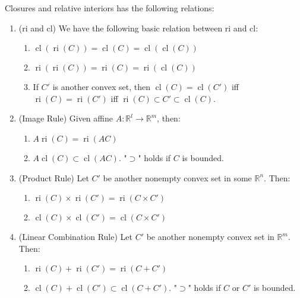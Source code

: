 \begin{prop}\label{prop:012-yoga-ri-cl}Closures and relative interiors has the following relations:
	\begin{enumerate}[label=(\alph*)]
		\item (ri and cl) We have the following basic relation between ri and cl:
		      \begin{enumerate}[label=(\roman*)]
			      \item $\operatorname{cl}(\operatorname{ri}(C))=\operatorname{cl}(C)=\operatorname{cl}(\operatorname{cl}(C))$
			      \item $\operatorname{ri}(\operatorname{ri}(C))=\operatorname{ri}(C)=\operatorname{ri}(\operatorname{cl}(C))$
			      \item If $C'$ is another convex set, then $\operatorname{cl}(C)=\operatorname{cl}(C')$ iff $\operatorname{ri}(C)=\operatorname{ri}(C')$ iff $\operatorname{ri}(C)\subset C'\subset\operatorname{cl}(C)$.
		      \end{enumerate}
		\item (Image Rule) Given affine $A:\mathbb{R}^l\to \mathbb{R}^m$, then:
		      \begin{enumerate}[label=(\roman*)]
			      \item $A\operatorname{ri}(C)=\operatorname{ri}(AC)$
			      \item $A\operatorname{cl}(C)\subset \operatorname{cl}(AC)$. "$\supset$" holds if $C$ is bounded.
		      \end{enumerate}
		\item (Product Rule) Let $C'$ be another nonempty convex set in some $\mathbb{R}^n$. Then:
		      \begin{enumerate}[label=(\roman*)]
			      \item $\operatorname{ri}(C)\times\operatorname{ri}(C')=\operatorname{ri}(C\times C')$
			      \item $\operatorname{cl}(C)\times\operatorname{cl}(C')=\operatorname{cl}(C\times C')$
		      \end{enumerate}
		\item (Linear Combination Rule) Let $C'$ be another nonempty convex set in $\mathbb{R}^m$. Then:
		      \begin{enumerate}[label=(\roman*)]
			      \item $\operatorname{ri}(C)+\operatorname{ri}(C')=\operatorname{ri}(C+C')$
			      \item $\operatorname{cl}(C)+\operatorname{cl}(C')\subset\operatorname{cl}(C+C')$. "$\supset$" holds if $C$ or $C'$ is bounded.

\end{enumerate}
\end{enumerate}
\end{prop}
